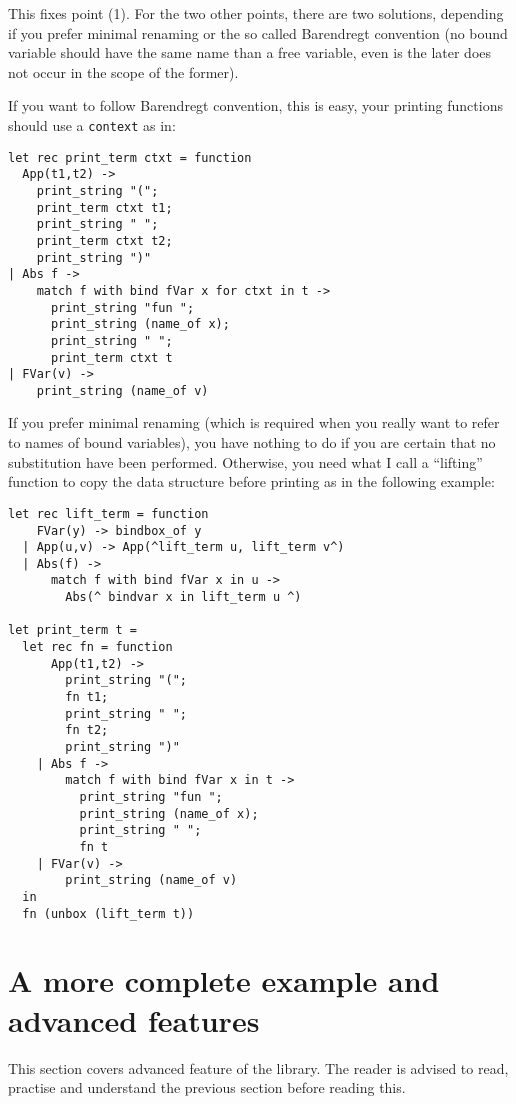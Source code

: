 \documentclass[11pt]{article}
\begin{document}
This fixes point (1). For the two other points, there are two solutions,
depending if you prefer minimal renaming or the so called Barendregt
convention (no bound variable should have the same name than a free
variable, even is the later does not occur in the scope of the
former).

If you want to follow Barendregt convention, this is easy, your
printing functions should use a \verb#context# as in:

\begin{verbatim}
let rec print_term ctxt = function
  App(t1,t2) ->
    print_string "(";
    print_term ctxt t1;
    print_string " ";
    print_term ctxt t2;
    print_string ")"
| Abs f ->
    match f with bind fVar x for ctxt in t ->
      print_string "fun ";
      print_string (name_of x);
      print_string " ";
      print_term ctxt t
| FVar(v) ->
    print_string (name_of v)
\end{verbatim}

If you prefer minimal renaming (which is required when you really want
to refer to names of bound variables), you have nothing to do if you are
certain that no substitution have been performed. Otherwise, you need
what I call a ``lifting'' function to copy the data structure before
printing as in the following example:

\begin{verbatim}
let rec lift_term = function
    FVar(y) -> bindbox_of y
  | App(u,v) -> App(^lift_term u, lift_term v^)
  | Abs(f) ->
      match f with bind fVar x in u ->
        Abs(^ bindvar x in lift_term u ^)

let print_term t =
  let rec fn = function
      App(t1,t2) ->
        print_string "(";
        fn t1;
        print_string " ";
        fn t2;
        print_string ")"
    | Abs f ->
        match f with bind fVar x in t ->
          print_string "fun ";
          print_string (name_of x);
          print_string " ";
          fn t
    | FVar(v) ->
        print_string (name_of v)
  in
  fn (unbox (lift_term t))
\end{verbatim}

\section{A more complete example and advanced features}

This section covers advanced feature of the library. The reader is
advised to read, practise and understand the previous section before
reading this.
\end{document}
